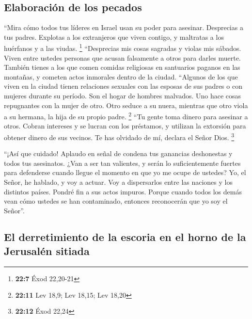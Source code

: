 \hypertarget{elaboraciuxf3n-de-los-pecados}{%
\subsection{Elaboración de los
pecados}\label{elaboraciuxf3n-de-los-pecados}}

 ``Mira cómo todos tus líderes en Israel usan su poder
para asesinar.  Desprecias a tus padres. Explotas a los
extranjeros que viven contigo, y maltratas a los huérfanos y a las
viudas. \footnote{\textbf{22:7} Éxod 22,20-21} 
``Desprecias mis cosas sagradas y violas mis sábados. 
Viven entre ustedes personas que acusan falsamente a otros para darles
muerte. También tienes a los que comen comidas religiosas en santuarios
paganos en las montañas, y cometen actos inmorales dentro de la ciudad.
 ``Algunos de los que viven en la ciudad tienen
relaciones sexuales con las esposas de sus padres o con mujeres durante
su período.  Son el hogar de hombres malvados. Uno hace
cosas repugnantes con la mujer de otro. Otro seduce a su nuera, mientras
que otro viola a su hermana, la hija de su propio padre. \footnote{\textbf{22:11}
  Lev 18,9; Lev 18,15; Lev 18,20}  ``Tu gente toma dinero
para asesinar a otros. Cobran intereses y se lucran con los préstamos, y
utilizan la extorsión para obtener dinero de sus vecinos. Te has
olvidado de mí, declara el Señor Dios. \footnote{\textbf{22:12} Éxod
  22,24}

 ``¡Así que cuidado! Aplaudo en señal de condena tus
ganancias deshonestas y todos tus asesinatos.  ¿Van a ser
tan valientes, y serán lo suficientemente fuertes para defenderse cuando
llegue el momento en que yo me ocupe de ustedes? Yo, el Señor, he
hablado, y voy a actuar.  Voy a dispersarlos entre las
naciones y los distintos países. Pondré fin a sus actos impuros.
 Porque cuando todos los demás vean cómo ustedes se han
contaminado, entonces reconocerán que yo soy el Señor''.

\hypertarget{el-derretimiento-de-la-escoria-en-el-horno-de-la-jerusaluxe9n-sitiada}{%
\subsection{El derretimiento de la escoria en el horno de la Jerusalén
sitiada}\label{el-derretimiento-de-la-escoria-en-el-horno-de-la-jerusaluxe9n-sitiada}}

